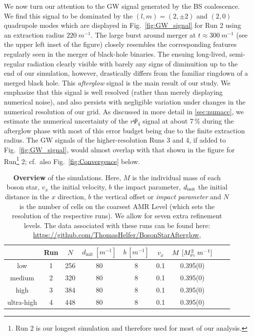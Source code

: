 \documentclass[aps,twocolumn,nofootinbib,superscriptaddress,amsfonts,floatfix
]{revtex4-1} %
\newcommand{\mpl}{M_{\mbox{\tiny Pl}}}
\begin{document}
We now turn our attention to the GW signal generated by the
BS coalescence. We find this signal to be dominated by the
$(l,m)=(2,\pm 2)$ and $(2,0)$ quadrupole modes which are
displayed in Fig.~\ref{fig:GW_signal} for Run 2 using an extraction
radius $220~m^{-1}$. The large burst around merger at $t\approx300~m^{-1}$ (see the upper left inset of the figure)
closely resembles the corresponding features
regularly seen in the merger of black-hole binaries.
The ensuing long-lived, semi-regular radiation clearly visible
with barely any signs of diminuition up to the end of our
simulation, however, drastically
differs from the familiar ringdown of a merged black hole. This
{\it afterglow} signal is the main result of our study. We
emphasize that this signal is well resolved (rather than
merely displaying numerical noise), and also persists with
negligible variation under changes in the numerical resolution
of our grid. As discussed in more detail in
\ref{sec:numacc}, we estimate the numerical uncertainty
of the $r\Psi_4$ signal at about $7\,\%$ during the afterglow phase
with most of this error budget being due to the finite extraction radius.
The GW signals of the higher-resolution Runs 3 and 4, if added
to Fig.~\ref{fig:GW_signal}, would almost overlap with
that shown in the figure for Run\footnote{Run 2 is our longest simulation
and therefore used for most of our analysis.} 2;
cf.~also Fig.~\ref{fig:Convergence} below.
\begin{table}
\begin{center}
\begin{tabular}{ c  c  c  c  c  c  c  c  c}
     \toprule
      & Run & $N$      & $d_{\text{init}}~[m^{-1}]$   & $b~[m^{-1}]$  & $v_x$ &  $M~[\mpl^2~m^{-1}]$  \\ 
     \midrule
     low &  1    & 256 & 80 & 8  & 0.1 & 0.395(0) \\
     medium &  2   & 320 & 80 & 8 & 0.1 & 0.395(0) \\
     high &  3    & 384 & 80 & 8 & 0.1 &  0.395(0)\\
     ultra-high &  4    & 448 & 80 & 8 & 0.1 &  0.395(0) \\
     \bottomrule
\end{tabular}
\caption{{\bf Overview} of the simulations. Here, $M$ is the individual mass of each boson star, $v_x$ the initial velocity, $b$ the impact parameter, $d_{\rm init}$ the initial distance in the $x$ direction, $b$ the vertical offset or {\it impact parameter} and $N$ is the number of cells on the coarsest AMR Level (which sets the resolution of the respective runs). We allow for seven extra refinement levels. The data associated with these runs can be found here: \url{https://github.com/ThomasHelfer/BosonStarAfterglow},}
\label{tab:Overview Runs}
\end{center}
\end{table}
\end{document}
